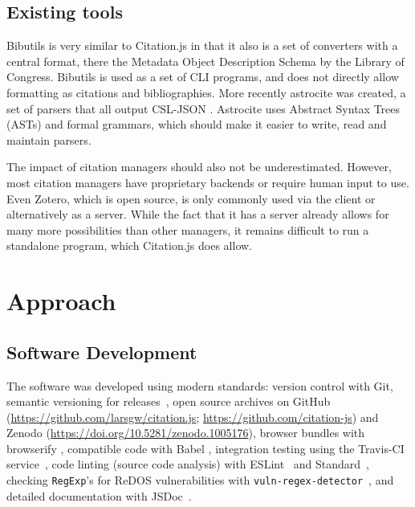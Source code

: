 \documentclass[fleqn,10pt,lineno]{wlpeerj} %
\begin{document}
\subsection*{Existing tools}

Bibutils \citep{putnam2005bibutils} is very similar to Citation.js in that it also is a set of converters with a central format, there the Metadata Object Description Schema by the Library of Congress. Bibutils is used as a set of CLI programs, and does not directly allow formatting as citations and bibliographies. More recently astrocite was created, a set of parsers that all output CSL-JSON \citep{Sifford2019dsifford/astrocite}. Astrocite uses Abstract Syntax Trees (ASTs) and formal grammars, which should make it easier to write, read and maintain parsers.

The impact of citation managers should also not be underestimated. However, most citation managers have proprietary backends or require human input to use. Even Zotero, which is open source, is only commonly used via the client or alternatively as a server. While the fact that it has a server already allows for many more possibilities than other managers, it remains difficult to run a standalone program, which Citation.js does allow.

\section*{Approach}

\subsection*{Software Development}

The software was developed using modern standards: version control with Git, semantic versioning for releases~\citep{preston-werner_semantic_2013}, open source archives on GitHub (\url{https://github.com/larsgw/citation.js}; \url{https://github.com/citation-js}) and Zenodo (\url{https://doi.org/10.5281/zenodo.1005176}), browser bundles with browserify \citep{Halliday2018browserify/browserify}, compatible code with Babel \citep{Zhu2018babel/babel}, integration testing using the Travis-CI service~\citep{noauthor_travis_2018}, code linting (source code analysis) with ESLint~\citep{Zakas2018eslint/eslint} and Standard~\citep{Aboukhadijeh2018standard/standard}, checking \texttt{RegExp}'s for ReDOS vulnerabilities with \texttt{vuln-regex-detector}~\citep{davis_impact_2018}, and detailed documentation with JSDoc~\citep{Williams2018jsdoc3/jsdoc}.
\end{document}
